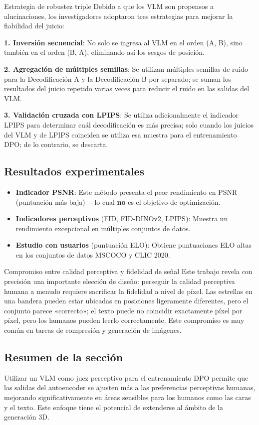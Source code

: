 \begin{importantbox}{Estrategia de robustez triple}
Debido a que los VLM son propensos a alucinaciones, los investigadores adoptaron tres estrategias para mejorar la fiabilidad del juicio:

\textbf{1. Inversión secuencial}: No solo se ingresa al VLM en el orden (A, B), sino también en el orden (B, A), eliminando así los sesgos de posición.

\textbf{2. Agregación de múltiples semillas}: Se utilizan múltiples semillas de ruido para la Decodificación A y la Decodificación B por separado; se suman los resultados del juicio repetido varias veces para reducir el ruido en las salidas del VLM.

\textbf{3. Validación cruzada con LPIPS}: Se utiliza adicionalmente el indicador LPIPS para determinar cuál decodificación es más precisa; solo cuando los juicios del VLM y de LPIPS coinciden se utiliza esa muestra para el entrenamiento DPO; de lo contrario, se descarta.
\end{importantbox}

\subsection{Resultados experimentales}

\begin{itemize}
    \item \textbf{Indicador PSNR}: Este método presenta el peor rendimiento en PSNR (puntuación más baja) —lo cual \textbf{no} es el objetivo de optimización.
    \item \textbf{Indicadores perceptivos} (FID, FID-DINOv2, LPIPS): Muestra un rendimiento excepcional en múltiples conjuntos de datos.
    \item \textbf{Estudio con usuarios} (puntuación ELO): Obtiene puntuaciones ELO altas en los conjuntos de datos MSCOCO y CLIC 2020.
\end{itemize}

\begin{knowledgebox}{Compromiso entre calidad perceptiva y fidelidad de señal}
Este trabajo revela con precisión una importante elección de diseño: perseguir la calidad perceptiva humana a menudo requiere sacrificar la fidelidad a nivel de píxel. Las estrellas en una bandera pueden estar ubicadas en posiciones ligeramente diferentes, pero el conjunto parece «correcto»; el texto puede no coincidir exactamente píxel por píxel, pero los humanos pueden leerlo correctamente. Este compromiso es muy común en tareas de compresión y generación de imágenes.
\end{knowledgebox}

\subsection{Resumen de la sección}

Utilizar un VLM como juez perceptivo para el entrenamiento DPO permite que las salidas del autoencoder se ajusten más a las preferencias perceptivas humanas, mejorando significativamente en áreas sensibles para los humanos como las caras y el texto. Este enfoque tiene el potencial de extenderse al ámbito de la generación 3D.


